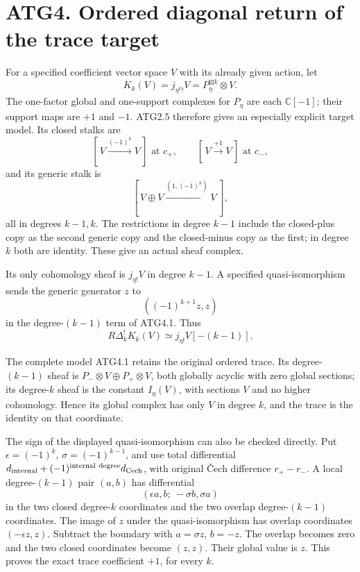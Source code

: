 \section{ATG4. Ordered diagonal return of the trace
target}\label{atg4.-ordered-diagonal-return-of-the-trace-target}

For a specified coefficient vector space \(V\) with its already given
action, let \[
K_k(V)=j_{\eta^k!}V=P_\eta^{\boxtimes k}\otimes V .
\] The one-factor global and one-support complexes for \(P_\eta\) are
each \(\mathbb C[-1]\); their support maps are \(+1\) and \(-1\). ATG2.5
therefore gives an especially explicit target model. Its closed stalks
are \[
[\,V\xrightarrow{(-1)^k}V\,]\text{ at }c_+,\qquad
[\,V\xrightarrow{+1}V\,]\text{ at }c_-,
\] and its generic stalk is \[
[\,V\oplus V\xrightarrow{(1,(-1)^k)}V\,],
\tag{ATG4.1}
\] all in degrees \(k-1,k\). The restrictions in degree \(k-1\) include
the closed-plus copy as the second generic copy and the closed-minus
copy as the first; in degree \(k\) both are identity. These give an
actual sheaf complex.

Its only cohomology sheaf is \(j_{\eta!}V\) in degree \(k-1\). A
specified quasi-isomorphism sends the generic generator \(z\) to \[
((-1)^{k+1}z,z)
\] in the degree-\((k-1)\) term of ATG4.1. Thus \[
\boxed{R\Delta_k^!K_k(V)\simeq j_{\eta!}V[-(k-1)].}
\tag{ATG4.2}
\]

The complete model ATG4.1 retains the original ordered trace. Its
degree-\((k-1)\) sheaf is \(P_-\otimes V\oplus P_+\otimes V\), both
globally acyclic with zero global sections; its degree-\(k\) sheaf is
the constant \(I_\eta(V)\), with sections \(V\) and no higher
cohomology. Hence its global complex has only \(V\) in degree \(k\), and
the trace is the identity on that coordinate.

The sign of the displayed quasi-isomorphism can also be checked
directly. Put \(\epsilon=(-1)^k\), \(\sigma=(-1)^{k-1}\), and use total
differential
\(d_{\rm internal}+(-1)^{\rm internal\ degree}d_{\rm Cech}\), with
original Čech difference \(r_+-r_-\). A local degree-\((k-1)\) pair
\((a,b)\) has differential \[
(\epsilon a,b;\ -\sigma b,\sigma a)
\] in the two closed degree-\(k\) coordinates and the two overlap
degree-\((k-1)\) coordinates. The image of \(z\) under the
quasi-isomorphism has overlap coordinates \((-\epsilon z,z)\). Subtract
the boundary with \(a=\sigma z\), \(b=-z\). The overlap becomes zero and
the two closed coordinates become \((z,z)\). Their global value is
\(z\). This proves the exact trace coefficient \(+1\), for every \(k\).

